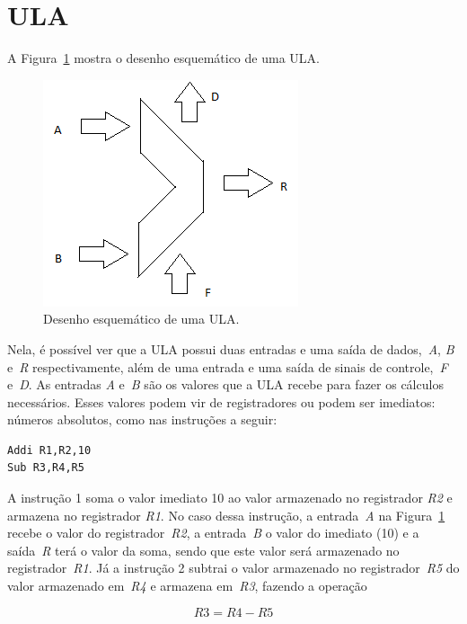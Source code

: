 \documentclass[11pt,a4paper,titlepage]{article}
\begin{document}
\section{ULA}\label{sec:ula}

A Figura~\ref{fig:ula} mostra o desenho esquemático de uma ULA.


\begin{figure}[h]
\centering
\includegraphics[]{images/ULA.png}
\caption{Desenho esquemático de uma ULA.}
\label{fig:ula}
\end{figure}

Nela, é possível ver que a ULA possui duas entradas e uma saída de dados,~\textit{A}, \textit{B} e~\textit{R} respectivamente, além de uma entrada e uma saída de sinais de controle,~\textit{F} e~\textit{D}.
As entradas \textit{A} e~\textit{B} são os valores que a ULA recebe para fazer os cálculos necessários.
Esses valores podem vir de registradores ou podem ser imediatos: números absolutos, como nas instruções a seguir:

\begin{lstlisting}
Addi R1,R2,10
Sub R3,R4,R5
\end{lstlisting}

A instrução 1 soma o valor imediato 10 ao valor armazenado no registrador \textit{R2} e armazena no registrador \textit{R1}.
No caso dessa instrução, a entrada~\textit{A} na Figura~\ref{fig:ula} recebe o valor do registrador~\textit{R2}, a entrada~\textit{B} o valor do imediato (10) e a saída~\textit{R} terá o valor da soma, sendo que este valor será armazenado no registrador~\textit{R1}.
Já a instrução 2 subtrai o valor armazenado no registrador~\textit{R5} do valor armazenado em~\textit{R4} e armazena em~\textit{R3}, fazendo a operação

\begin{equation}
\label{eq1:sub-ula}
R3=R4-R5
\end{equation}
\end{document}
